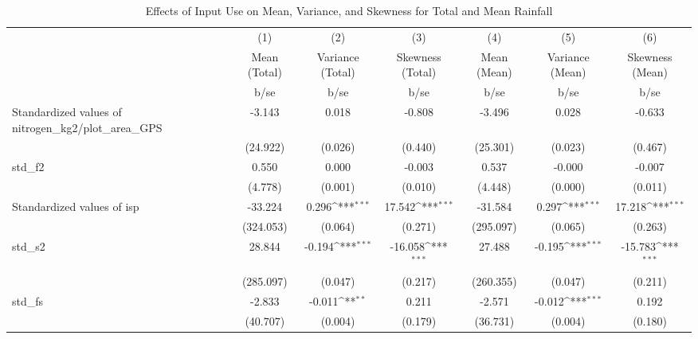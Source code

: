 \begin{table}[htbp]\centering
\def\sym#1{\ifmmode^{#1}\else\(^{#1}\)\fi}
\caption{Effects of Input Use on Mean, Variance, and Skewness for Total and Mean Rainfall}
\begin{tabular}{l*{6}{c}}
\toprule
                &\multicolumn{1}{c}{(1)}&\multicolumn{1}{c}{(2)}&\multicolumn{1}{c}{(3)}&\multicolumn{1}{c}{(4)}&\multicolumn{1}{c}{(5)}&\multicolumn{1}{c}{(6)}\\
                &\multicolumn{1}{c}{Mean (Total)}&\multicolumn{1}{c}{Variance (Total)}&\multicolumn{1}{c}{Skewness (Total)}&\multicolumn{1}{c}{Mean (Mean)}&\multicolumn{1}{c}{Variance (Mean)}&\multicolumn{1}{c}{Skewness (Mean)}\\
                &     b/se         &     b/se         &     b/se         &     b/se         &     b/se         &     b/se         \\
\midrule
Standardized values of nitrogen\_kg2/plot\_area\_GPS&   -3.143         &    0.018         &   -0.808         &   -3.496         &    0.028         &   -0.633         \\
                & (24.922)         &  (0.026)         &  (0.440)         & (25.301)         &  (0.023)         &  (0.467)         \\
std\_f2          &    0.550         &    0.000         &   -0.003         &    0.537         &   -0.000         &   -0.007         \\
                &  (4.778)         &  (0.001)         &  (0.010)         &  (4.448)         &  (0.000)         &  (0.011)         \\
Standardized values of isp&  -33.224         &    0.296\sym{***}&   17.542\sym{***}&  -31.584         &    0.297\sym{***}&   17.218\sym{***}\\
                &(324.053)         &  (0.064)         &  (0.271)         &(295.097)         &  (0.065)         &  (0.263)         \\
std\_s2          &   28.844         &   -0.194\sym{***}&  -16.058\sym{***}&   27.488         &   -0.195\sym{***}&  -15.783\sym{***}\\
                &(285.097)         &  (0.047)         &  (0.217)         &(260.355)         &  (0.047)         &  (0.211)         \\
std\_fs          &   -2.833         &   -0.011\sym{**} &    0.211         &   -2.571         &   -0.012\sym{***}&    0.192         \\
                & (40.707)         &  (0.004)         &  (0.179)         & (36.731)         &  (0.004)         &  (0.180)         \\

\end{tabular}
\end{table}
